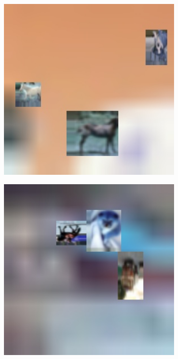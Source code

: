 \begin{figure}[H]
	\begin{center}
	\begin{subfigure}{.3\textwidth}
		\includegraphics[width=1\textwidth]{img/cifar-zsd-test400.jpg}
		\label{fig:ex1}
	\end{subfigure}
	\begin{subfigure}{.3\textwidth}
		\includegraphics[width=1\textwidth]{img/cifar-zsd-test379.jpg}

\end{subfigure}
\end{center}
\end{figure}

